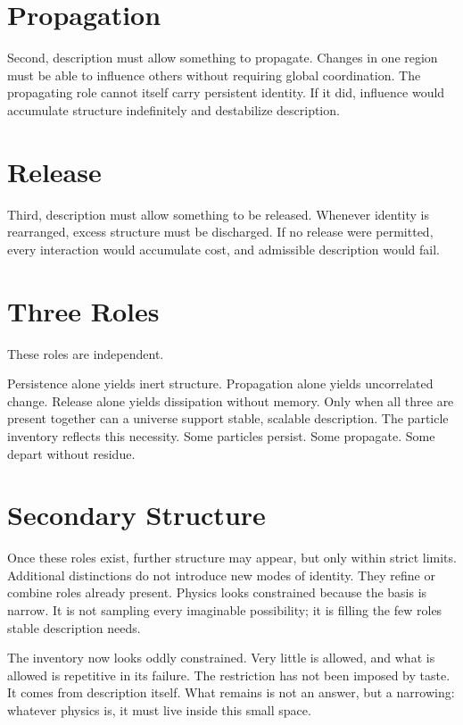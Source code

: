 \documentclass[11pt,twoside,openright]{book}
\begin{document}
\section*{Propagation}

Second, description must allow something to propagate. Changes in one region must be able to influence others without requiring global coordination. The propagating role cannot itself carry persistent identity. If it did, influence would accumulate structure indefinitely and destabilize description.

\section*{Release}

Third, description must allow something to be released. Whenever identity is rearranged, excess structure must be discharged. If no release were permitted, every interaction would accumulate cost, and admissible description would fail.

\section*{Three Roles}

These roles are independent.

Persistence alone yields inert structure. Propagation alone yields uncorrelated change. Release alone yields dissipation without memory. Only when all three are present together can a universe support stable, scalable description. The particle inventory reflects this necessity. Some particles persist. Some propagate. Some depart without residue.

\section*{Secondary Structure}

Once these roles exist, further structure may appear, but only within strict limits. Additional distinctions do not introduce new modes of identity. They refine or combine roles already present. Physics looks constrained because the basis is narrow. It is not sampling every imaginable possibility; it is filling the few roles stable description needs.

The inventory now looks oddly constrained. Very little is allowed, and what is allowed is repetitive in its failure. The restriction has not been imposed by taste. It comes from description itself. What remains is not an answer, but a narrowing: whatever physics is, it must live inside this small space.
\end{document}

